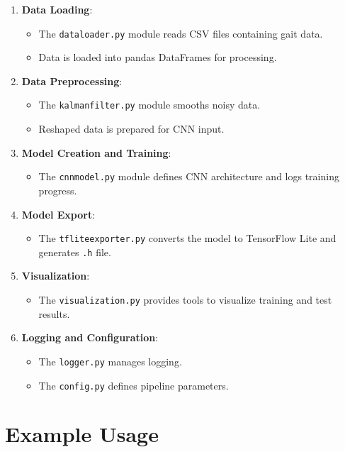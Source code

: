 \begin{enumerate}
	\item \textbf{Data Loading}:
	\begin{itemize}
		\item The \texttt{dataloader.py} module reads CSV files containing gait data.
		\item Data is loaded into pandas DataFrames for processing.
	\end{itemize}
	
	\item \textbf{Data Preprocessing}:
	\begin{itemize}
		\item The \texttt{kalmanfilter.py} module smooths noisy data.
		\item Reshaped data is prepared for CNN input.
	\end{itemize}
	
	\item \textbf{Model Creation and Training}:
	\begin{itemize}
		\item The \texttt{cnnmodel.py} module defines CNN architecture and logs training progress.
	\end{itemize}
	
	\item \textbf{Model Export}:
	\begin{itemize}
		\item The \texttt{tfliteexporter.py} converts the model to TensorFlow Lite and generates \texttt{.h} file.
	\end{itemize}
	
	\item \textbf{Visualization}:
	\begin{itemize}
		\item The \texttt{visualization.py} provides tools to visualize training and test results.
	\end{itemize}
	
	\item \textbf{Logging and Configuration}:
	\begin{itemize}
		\item The \texttt{logger.py} manages logging.
		\item The \texttt{config.py} defines pipeline parameters.
	\end{itemize}
\end{enumerate}

\section{Example Usage}

